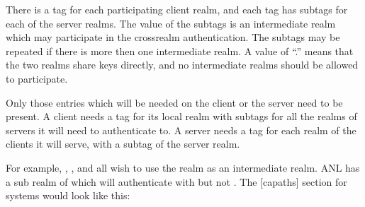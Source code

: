 \documentclass[letterpaper,10pt,english]{sphinxmanual}
\begin{document}
\sphinxAtStartPar
There is a tag for each participating client realm, and each tag has
subtags for each of the server realms.  The value of the subtags is an
intermediate realm which may participate in the cross\sphinxhyphen{}realm
authentication.  The subtags may be repeated if there is more then one
intermediate realm.  A value of “.” means that the two realms share
keys directly, and no intermediate realms should be allowed to
participate.

\sphinxAtStartPar
Only those entries which will be needed on the client or the server
need to be present.  A client needs a tag for its local realm with
subtags for all the realms of servers it will need to authenticate to.
A server needs a tag for each realm of the clients it will serve, with
a subtag of the server realm.

\sphinxAtStartPar
For example, , , and  all wish to
use the  realm as an intermediate realm.  ANL has a sub
realm of  which will authenticate with 
but not .  The {[}capaths{]} section for  systems
would look like this:

\begin{sphinxVerbatim}[commandchars=\\\{\}]
\PYG{p}{[}\PYG{p}{]}
      
          
          
          
          
      
          
      
          
      
          
      
          
\end{sphinxVerbatim}
\end{document}

